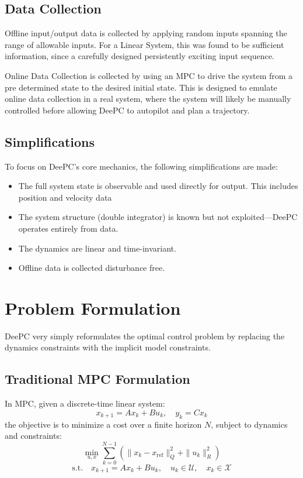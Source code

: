 \documentclass[11pt,a4paper]{article}
\begin{document}
\subsection{Data Collection}
Offline input/output data is collected by applying random inputs spanning the range of allowable inputs. For a Linear System, this was found to be sufficient information, since
a carefully designed persistently exciting input sequence.

Online Data Collection is collected by using an MPC to drive the system from a pre determined state to the desired initial state. This is designed to emulate online data collection in a real system, where the system will likely be manually controlled before allowing DeePC to autopilot and plan a trajectory.

\subsection{Simplifications}
To focus on DeePC's core mechanics, the following simplifications are made:
\begin{itemize}
    \item The full system state is observable and used directly for output. This includes position and velocity data
    \item The system structure (double integrator) is known but not exploited—DeePC operates entirely from data.
    \item The dynamics are linear and time-invariant.
    \item Offline data is collected disturbance free.
\end{itemize}


\section{Problem Formulation}

DeePC very simply reformulates the optimal control problem by replacing the dynamics constraints with the implicit model constraints.

\subsection{Traditional MPC Formulation}
In MPC, given a discrete-time linear system:
\[
x_{k+1} = A x_k + B u_k, \quad y_k = C x_k
\]
the objective is to minimize a cost over a finite horizon \( N \), subject to dynamics and constraints:
\[
\min_{u, x} \sum_{k=0}^{N-1} \left( \|x_k - x_{\text{ref}}\|_Q^2 + \|u_k\|_R^2 \right)
\]
\[
\text{s.t.} \quad x_{k+1} = A x_k + B u_k,\quad u_k \in \mathcal{U},\quad x_k \in \mathcal{X}
\]
\end{document}
